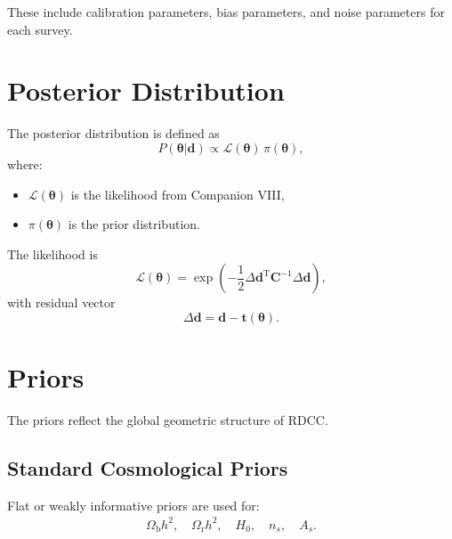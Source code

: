 \documentclass[11pt,a4paper]{article}
\begin{document}
These include calibration parameters, bias parameters, and noise parameters for
each survey.

\section[Posterior Distribution]{Posterior Distribution}

The posterior distribution is defined as
\begin{equation}
P(\boldsymbol{\theta}|\mathbf{d})
\propto
\mathcal{L}(\boldsymbol{\theta})
\,
\pi(\boldsymbol{\theta}),
\end{equation}
where:
\begin{itemize}[leftmargin=0.8cm]
  \item $\mathcal{L}(\boldsymbol{\theta})$ is the likelihood from Companion VIII,
  \item $\pi(\boldsymbol{\theta})$ is the prior distribution.
\end{itemize}

The likelihood is
\begin{equation}
\mathcal{L}(\boldsymbol{\theta})
=
\exp\left(
-\frac{1}{2}
\Delta\mathbf{d}^{\mathrm{T}}
\mathbf{C}^{-1}
\Delta\mathbf{d}
\right),
\end{equation}
with residual vector
\begin{equation}
\Delta\mathbf{d}
=
\mathbf{d}
-
\mathbf{t}(\boldsymbol{\theta}).
\end{equation}

\section{Priors}

The priors reflect the global geometric structure of RDCC.

\subsection[Standard Priors]{Standard Cosmological Priors}

Flat or weakly informative priors are used for:
\begin{align}
\Omega_{\mathrm{b}} h^2, \quad
\Omega_{\mathrm{r}} h^2, \quad
H_0, \quad
n_s, \quad
A_s.
\end{align}
\end{document}
